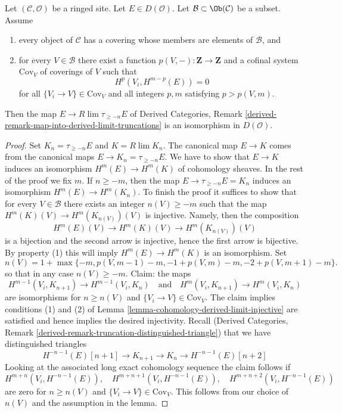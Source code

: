 \begin{lemma}
\label{lemma-is-limit-per-object}
Let $(\mathcal{C}, \mathcal{O})$ be a ringed site. Let $E \in D(\mathcal{O})$.
Let $\mathcal{B} \subset \Ob(\mathcal{C})$ be a subset. Assume
\begin{enumerate}
\item every object of $\mathcal{C}$ has a covering whose members
are elements of $\mathcal{B}$, and
\item for every $V \in \mathcal{B}$ there exist a function
$p(V, -) : \mathbf{Z} \to \mathbf{Z}$ and a cofinal system $\text{Cov}_V$
of coverings of $V$ such that
$$
H^p(V_i, H^{m - p}(E)) = 0
$$
for all $\{V_i \to V\} \in \text{Cov}_V$ and all integers $p, m$
satisfying $p > p(V, m)$.
\end{enumerate}
Then the map $E \to R\lim \tau_{\geq -n} E$ of
Derived Categories, Remark
\ref{derived-remark-map-into-derived-limit-truncations}
is an isomorphism in $D(\mathcal{O})$.
\end{lemma}

\begin{proof}
Set $K_n = \tau_{\geq -n}E$ and $K = R\lim K_n$.
The canonical map $E \to K$
comes from the canonical maps $E \to K_n = \tau_{\geq -n}E$.
We have to show that $E \to K$ induces an isomorphism
$H^m(E) \to H^m(K)$ of cohomology sheaves. In the rest of the
proof we fix $m$. If $n \geq -m$, then
the map $E \to \tau_{\geq -n}E = K_n$ induces an isomorphism
$H^m(E) \to H^m(K_n)$.
To finish the proof it suffices to show that for every $V \in \mathcal{B}$
there exists an integer $n(V) \geq -m$ such that the map
$H^m(K)(V) \to H^m(K_{n(V)})(V)$ is injective. Namely, then
the composition
$$
H^m(E)(V) \to H^m(K)(V) \to H^m(K_{n(V)})(V)
$$
is a bijection and the second arrow is injective, hence the
first arrow is bijective. By property (1) this will imply
$H^m(E) \to H^m(K)$ is an isomorphism. Set
$$
n(V) = 1 + \max\{-m, p(V, m - 1) - m, -1 + p(V, m) - m, -2 + p(V, m + 1) - m\}.
$$
so that in any case $n(V) \geq -m$. Claim: the maps
$$
H^{m - 1}(V_i, K_{n + 1}) \to H^{m - 1}(V_i, K_n)
\quad\text{and}\quad
H^m(V_i, K_{n + 1}) \to H^m(V_i, K_n)
$$
are isomorphisms for $n \geq n(V)$ and $\{V_i \to V\} \in \text{Cov}_V$.
The claim implies conditions
(1) and (2) of Lemma \ref{lemma-cohomology-derived-limit-injective}
are satisfied and hence implies the desired injectivity.
Recall (Derived Categories, Remark
\ref{derived-remark-truncation-distinguished-triangle})
that we have distinguished triangles
$$
H^{-n - 1}(E)[n + 1] \to
K_{n + 1} \to K_n \to H^{-n - 1}(E)[n + 2]
$$
Looking at the associated long exact cohomology sequence the claim follows if
$$
H^{m + n}(V_i, H^{-n - 1}(E)),\quad
H^{m + n + 1}(V_i, H^{-n - 1}(E)),\quad
H^{m + n + 2}(V_i, H^{-n - 1}(E))
$$
are zero for $n \geq n(V)$ and $\{V_i \to V\} \in \text{Cov}_V$.
This follows from our choice of $n(V)$
and the assumption in the lemma.
\end{proof}

